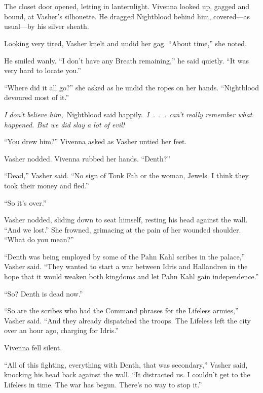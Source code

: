 \chapter{}

The closet door opened, letting in lanternlight. Vivenna looked up, gagged and bound, at Vasher’s silhouette. He dragged Nightblood behind him, covered—as usual—by his silver sheath.

Looking very tired, Vasher knelt and undid her gag. “About time,” she noted.

He smiled wanly. “I don’t have any Breath remaining,” he said quietly. “It was very hard to locate you.”

“Where did it all go?” she asked as he undid the ropes on her hands. “Nightblood devoured most of it.”

\textit{I don’t believe him,}~Nightblood said happily.~\textit{I~.~.~. can’t really remember what happened. But we did slay a lot of evil!}

“You drew him?” Vivenna asked as Vasher untied her feet.

Vasher nodded. Vivenna rubbed her hands. “Denth?”

“Dead,” Vasher said. “No sign of Tonk Fah or the woman, Jewels. I think they took their money and fled.”

“So it’s over.”

Vasher nodded, sliding down to seat himself, resting his head against the wall. “And we lost.” She frowned, grimacing at the pain of her wounded shoulder. “What do you mean?”

“Denth was being employed by some of the Pahn Kahl scribes in the palace,” Vasher said. “They wanted to start a war between Idris and Hallandren in the hope that it would weaken both kingdoms and let Pahn Kahl gain independence.”

“So? Denth is dead now.”

“So are the scribes who had the Command phrases for the Lifeless armies,” Vasher said. “And they already dispatched the troops. The Lifeless left the city over an hour ago, charging for Idris.”

Vivenna fell silent.

“All of this fighting, everything with Denth, that was secondary,” Vasher said, knocking his head back against the wall. “It distracted us. I couldn’t get to the Lifeless in time. The war has begun. There’s no way to stop it.”

